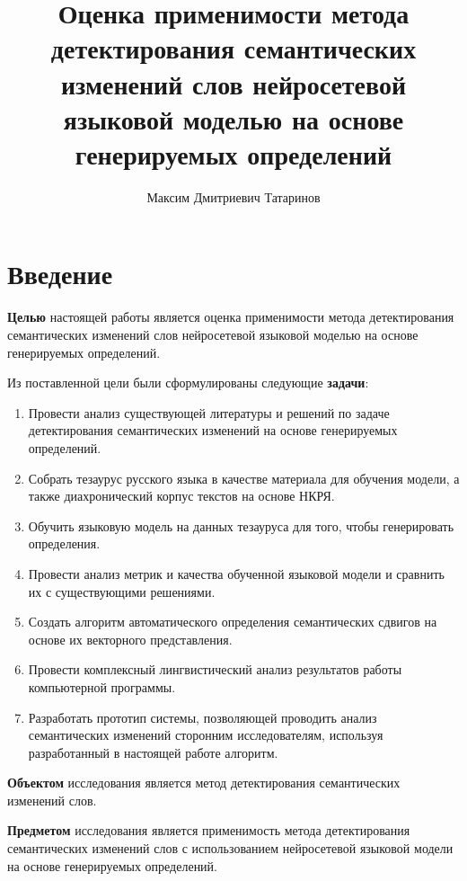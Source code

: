 \documentclass[LI,VKR]{HSEUniversity}
\title{Оценка применимости метода детектирования семантических изменений слов нейросетевой языковой моделью на основе генерируемых определений}
\author{Максим Дмитриевич Татаринов}
\begin{document}
\maketitle

\chapter*{Введение}


\textbf{Целью} настоящей работы является оценка применимости метода детектирования семантических
изменений слов нейросетевой языковой моделью на основе генерируемых определений.

Из поставленной цели были сформулированы следующие \textbf{задачи}:
\begin{enumerate}
    \item  Провести анализ существующей литературы и решений по задаче детектирования семантических
    изменений на основе генерируемых определений.
    \item  Собрать тезаурус русского языка в качестве материала для обучения модели, а также
    диахронический корпус текстов на основе НКРЯ.
    \item  Обучить языковую модель на данных тезауруса для того, чтобы генерировать определения.
    \item  Провести анализ метрик и качества обученной языковой модели и сравнить их с
    существующими решениями.
    \item  Создать алгоритм автоматического определения семантических сдвигов на основе их
    векторного представления.
    \item  Провести комплексный лингвистический анализ результатов работы компьютерной программы.
    \item  Разработать прототип системы, позволяющей проводить анализ семантических изменений
    сторонним исследователям, используя разработанный в настоящей работе алгоритм.
\end{enumerate}

\textbf{Объектом} исследования является метод детектирования семантических изменений слов.

\textbf{Предметом} исследования является применимость метода детектирования семантических изменений
слов с использованием нейросетевой языковой модели на основе генерируемых определений.
\end{document}
